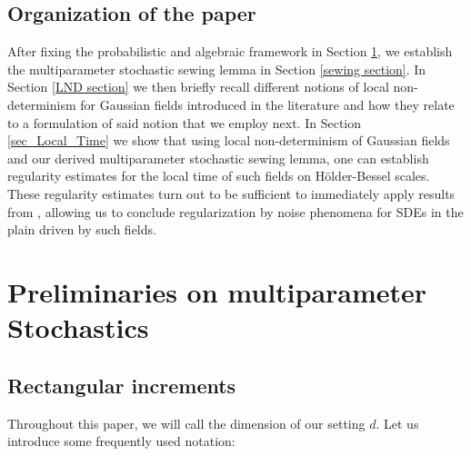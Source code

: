 \documentclass[11pt,oneside,english,reqno]{amsart}
\numberwithin{equation}{section}
\numberwithin{figure}{section}
\theoremstyle{plain}
\theoremstyle{definition}
\theoremstyle{remark}
\theoremstyle{plain}
\theoremstyle{plain}
\theoremstyle{plain}
\theoremstyle{plain}
\theoremstyle{plain}
\begin{document}
\subsection*{Organization of the paper}
After fixing the probabilistic and algebraic framework in Section \ref{preliminaries}, we establish the multiparameter stochastic sewing lemma in Section \ref{sewing section}. In Section \ref{LND section} we then briefly recall different notions of local non-determinism for Gaussian fields introduced in the literature and how they relate to a formulation of said notion that we employ next. In Section \ref{sec_Local_Time} we show that using local non-determinism of Gaussian fields and our derived multiparameter stochastic sewing lemma, one can establish regularity estimates for the local time of such fields on H\"older-Bessel scales. These regularity estimates turn out to be sufficient to immediately apply results from \cite{Bechtold2023}, allowing us to conclude regularization by noise phenomena for SDEs in the plain driven by such fields. 

\section{Preliminaries on multiparameter Stochastics}
\label{preliminaries}
\subsection{Rectangular increments}

Throughout this paper, we will call the dimension of our setting $d$. Let us introduce some frequently used notation:
\end{document}
